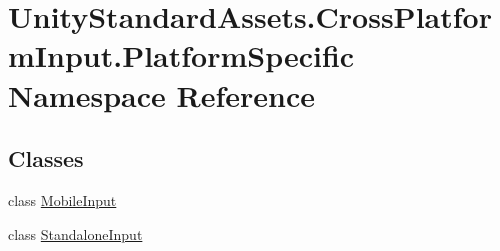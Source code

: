 \hypertarget{namespace_unity_standard_assets_1_1_cross_platform_input_1_1_platform_specific}{}\section{Unity\+Standard\+Assets.\+Cross\+Platform\+Input.\+Platform\+Specific Namespace Reference}
\label{namespace_unity_standard_assets_1_1_cross_platform_input_1_1_platform_specific}
\subsection*{Classes}
\begin{DoxyCompactItemize}
\item 
class \hyperlink{class_unity_standard_assets_1_1_cross_platform_input_1_1_platform_specific_1_1_mobile_input}{Mobile\+Input}
\item 
class \hyperlink{class_unity_standard_assets_1_1_cross_platform_input_1_1_platform_specific_1_1_standalone_input}{Standalone\+Input}
\end{DoxyCompactItemize}
